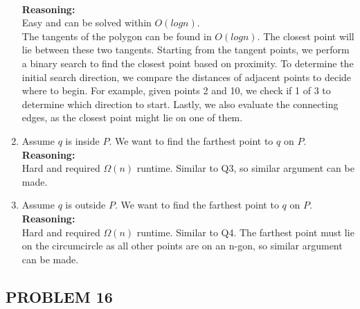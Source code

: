 \documentclass{article}
\begin{document}
\begin{enumerate}
    \\
    \textbf{Reasoning: }
    \\
    Easy and can be solved within $O(logn)$. 
    \\
    The tangents of the polygon can be found in $O(logn)$. The closest point will lie between these two tangents. Starting from the tangent points, we perform a binary search to find the closest point based on proximity. To determine the initial search direction, we compare the distances of adjacent points to decide where to begin. For example, given points 2 and 10, we check if 1 of 3 to determine which direction to start.
    Lastly, we also evaluate the connecting edges, as the closest point might lie on one of them.
    \item Assume $q$ is inside $P$. We want to find the farthest point to $q$ on $P$.
    \\
    \textbf{Reasoning: }
    \\
    Hard and required $\Omega(n)$ runtime. Similar to Q3, so similar argument can be made.
    \item Assume $q$ is outside $P$. We want to find the farthest point to $q$ on $P$.
    \\
    \textbf{Reasoning: }
    \\
    Hard and required $\Omega(n)$ runtime. Similar to Q4. The farthest point must lie on the circumcircle as all other points are on an n-gon, so similar argument can be made.
\end{enumerate}

\newpage

\subsection*{PROBLEM 16}
\end{document}
